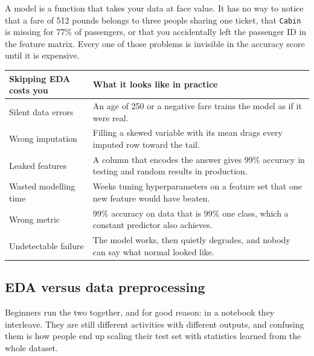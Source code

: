 \documentclass[11pt,a4paper]{article}
\begin{document}
A model is a function that takes your data at face value. It has no way to notice that a
fare of 512 pounds belongs to three people sharing one ticket, that \texttt{Cabin} is
missing for 77\% of passengers, or that you accidentally left the passenger ID in the
feature matrix. Every one of those problems is invisible in the accuracy score until it is
expensive.

\begin{tabularx}{\textwidth}{@{}lX@{}}
\toprule
\rowcolor{tablehead} \textbf{Skipping EDA costs you} & \textbf{What it looks like in practice} \\
\midrule
Silent data errors & An age of 250 or a negative fare trains the model as if it were real. \\
Wrong imputation & Filling a skewed variable with its mean drags every imputed row toward the tail. \\
Leaked features & A column that encodes the answer gives 99\% accuracy in testing and random results in production. \\
Wasted modelling time & Weeks tuning hyperparameters on a feature set that one new feature would have beaten. \\
Wrong metric & 99\% accuracy on data that is 99\% one class, which a constant predictor also achieves. \\
Undetectable failure & The model works, then quietly degrades, and nobody can say what normal looked like. \\
\bottomrule
\end{tabularx}


\subsection{EDA versus data preprocessing}

Beginners run the two together, and for good reason: in a notebook they interleave. They
are still different activities with different outputs, and confusing them is how people end
up scaling their test set with statistics learned from the whole dataset.
\end{document}
